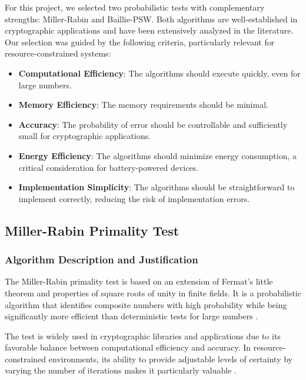 For this project, we selected two probabilistic tests with complementary strengths: Miller-Rabin and Baillie-PSW. Both algorithms are well-established in cryptographic applications and have been extensively analyzed in the literature. Our selection was guided by the following criteria, particularly relevant for resource-constrained systems:

\begin{itemize}
    \item \textbf{Computational Efficiency}: The algorithms should execute quickly, even for large numbers.
    
    \item \textbf{Memory Efficiency}: The memory requirements should be minimal.
    
    \item \textbf{Accuracy}: The probability of error should be controllable and sufficiently small for cryptographic applications.
    
    \item \textbf{Energy Efficiency}: The algorithms should minimize energy consumption, a critical consideration for battery-powered devices.
    
    \item \textbf{Implementation Simplicity}: The algorithms should be straightforward to implement correctly, reducing the risk of implementation errors.
\end{itemize}

\subsection{Miller-Rabin Primality Test}

\subsubsection{Algorithm Description and Justification}

The Miller-Rabin primality test is based on an extension of Fermat's little theorem and properties of square roots of unity in finite fields. It is a probabilistic algorithm that identifies composite numbers with high probability while being significantly more efficient than deterministic tests for large numbers \cite{miller1975, rabin1980}.

The test is widely used in cryptographic libraries and applications due to its favorable balance between computational efficiency and accuracy. In resource-constrained environments, its ability to provide adjustable levels of certainty by varying the number of iterations makes it particularly valuable \cite{taxonomy_primality, hardware_baillie}.

